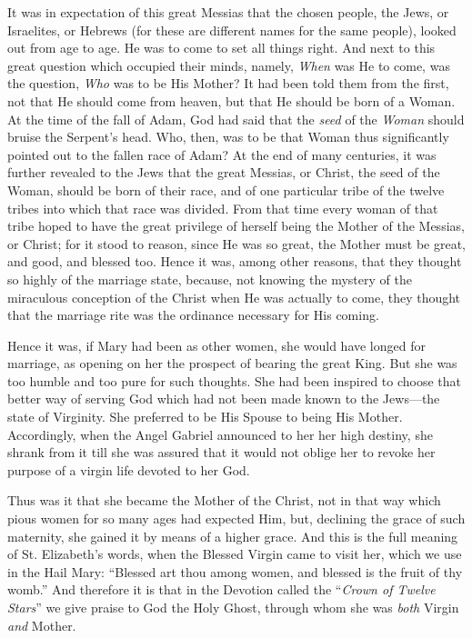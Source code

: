 It was in expectation of this
great Messias that the chosen people, the Jews, or Israelites, or
Hebrews (for these are different names for the same people), looked out
from age to age. He was to come to set all things right. And next to
this great question which occupied their minds, namely, \emph{When} was
He to come, was the question, \emph{Who} was to be His Mother? It had
been told them from the first, not that He should come from heaven, but
that He should be born of a Woman. At the time of the fall of Adam, God
had said that the \emph{seed} of the \emph{Woman} should bruise the
Serpent's head. Who, then, was to be that Woman thus significantly
pointed out to the fallen race of Adam? At the end of many centuries, it
was further revealed to the Jews that the great Messias, or Christ, the
seed of the Woman, should be born of their race, and of one particular
tribe of the twelve tribes into which that race was divided. From that
time every woman of that tribe hoped to have the great privilege of
herself being the Mother of the Messias, or Christ; for it stood to
reason, since He was so great, the Mother must be great, and good, and
blessed too. Hence it was, among other reasons, that they thought so
highly of the marriage state, because, not knowing the mystery of the miraculous conception of the Christ when He was actually to come,
they thought that the marriage rite was the ordinance necessary for His
coming.

Hence it was, if Mary had been
as other women, she would have longed for marriage, as opening on her
the prospect of bearing the great King. But she was too humble and too
pure for such thoughts. She had been inspired to choose that better way
of serving God which had not been made known to the Jews—the state of
Virginity. She preferred to be His Spouse to being His Mother.
Accordingly, when the Angel Gabriel announced to her her high destiny,
she shrank from it till she was assured that it would not oblige her to
revoke her purpose of a virgin life devoted to her God.

Thus was it that she became the
Mother of the Christ, not in that way which pious women for so many ages
had expected Him, but, declining the grace of such maternity, she gained
it by means of a higher grace. And this is the full meaning of St.
Elizabeth's words, when the Blessed Virgin came to visit her, which we
use in the Hail Mary: ``Blessed art thou among women, and blessed is the
fruit of thy womb.'' And therefore it is that in the Devotion called the ``\emph{Crown
of Twelve Stars}'' we give praise to God the Holy Ghost, through whom
she was \emph{both} Virgin \emph{and} Mother.

